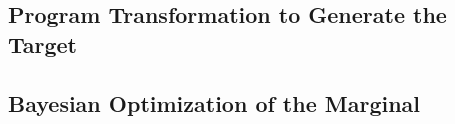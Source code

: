 \subsection{Program Transformation to Generate the Target}
\label{sec:transform}


%

\subsection{Bayesian Optimization of the Marginal}
\label{sec:BOPP}


\label{sec:bopp-for-ml}



